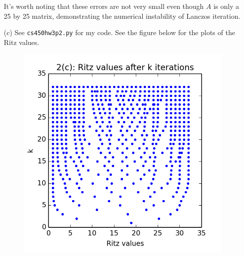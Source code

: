 \documentclass[10pt]{article}
\begin{document}
\begin{enumerate}
It's worth noting that these errors are not very small even though $A$ is only a 25 by 25 matrix, demonstrating the numerical instability of Lanczos iteration.

\item[(c)] See \verb+cs450hw3p2.py+ for my code. See the figure below for the plots of the Ritz values.

\begin{figure}[H]
  \centering
    \includegraphics[scale=0.8]{p2fig1}
\end{figure}

\end{enumerate}

\end{document}
